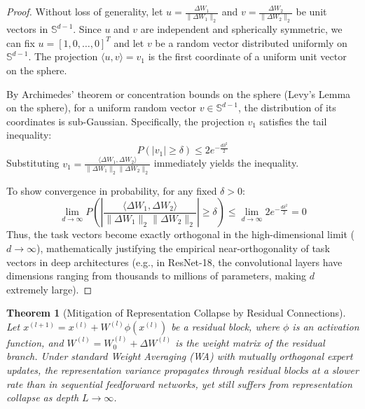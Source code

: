 \documentclass{article}
\theoremstyle{plain}
\newtheorem{theorem}{Theorem}[section]
\theoremstyle{definition}
\theoremstyle{remark}
\begin{document}
\begin{proof}
Without loss of generality, let $u = \frac{\Delta W_1}{\|\Delta W_1\|_2}$ and $v = \frac{\Delta W_2}{\|\Delta W_2\|_2}$ be unit vectors in $\mathbb{S}^{d-1}$. Since $u$ and $v$ are independent and spherically symmetric, we can fix $u = [1, 0, \dots, 0]^T$ and let $v$ be a random vector distributed uniformly on $\mathbb{S}^{d-1}$. The projection $\langle u, v \rangle = v_1$ is the first coordinate of a uniform unit vector on the sphere.

By Archimedes' theorem or concentration bounds on the sphere (Levy's Lemma on the sphere), for a uniform random vector $v \in \mathbb{S}^{d-1}$, the distribution of its coordinates is sub-Gaussian. Specifically, the projection $v_1$ satisfies the tail inequality:
\begin{equation}
    P(|v_1| \geq \delta) \leq 2 e^{-\frac{d \delta^2}{2}}
\end{equation}
Substituting $v_1 = \frac{\langle \Delta W_1, \Delta W_2 \rangle}{\|\Delta W_1\|_2 \|\Delta W_2\|_2}$ immediately yields the inequality.

To show convergence in probability, for any fixed $\delta > 0$:
\begin{equation}
    \lim_{d \to \infty} P\left( \left| \frac{\langle \Delta W_1, \Delta W_2 \rangle}{\|\Delta W_1\|_2 \|\Delta W_2\|_2} \right| \geq \delta \right) \leq \lim_{d \to \infty} 2 e^{-\frac{d \delta^2}{2}} = 0
\end{equation}
Thus, the task vectors become exactly orthogonal in the high-dimensional limit ($d \to \infty$), mathematically justifying the empirical near-orthogonality of task vectors in deep architectures (e.g., in ResNet-18, the convolutional layers have dimensions ranging from thousands to millions of parameters, making $d$ extremely large).
\end{proof}

\begin{theorem}[Mitigation of Representation Collapse by Residual Connections]
Let $x^{(l+1)} = x^{(l)} + W^{(l)} \phi(x^{(l)})$ be a residual block, where $\phi$ is an activation function, and $W^{(l)} = W_0^{(l)} + \Delta W^{(l)}$ is the weight matrix of the residual branch. Under standard Weight Averaging (WA) with mutually orthogonal expert updates, the representation variance propagates through residual blocks at a slower rate than in sequential feedforward networks, yet still suffers from representation collapse as depth $L \to \infty$.
\end{theorem}
\end{document}
